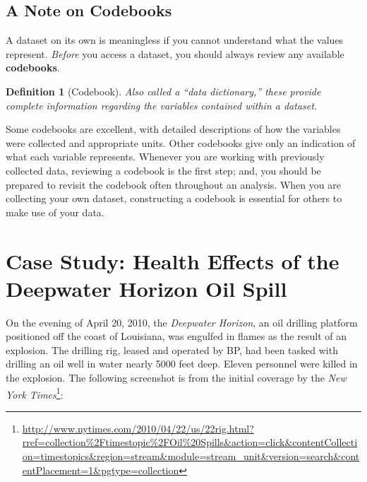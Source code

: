 \documentclass[
]{book}
\theoremstyle{plain}
\theoremstyle{mydefn}
\newtheorem{definition}{Definition}[chapter]
\theoremstyle{myexmpl}
\theoremstyle{remark}
\begin{document}
\hypertarget{a-note-on-codebooks}{%
\section{A Note on Codebooks}\label{a-note-on-codebooks}}

A dataset on its own is meaningless if you cannot understand what the values represent. \emph{Before} you access a dataset, you should always review any available \textbf{codebooks}.

\begin{definition}[Codebook]
\protect\hypertarget{def:defn-codebook}{}{\label{def:defn-codebook} {} }Also called a ``data dictionary,'' these provide complete information regarding the variables contained within a dataset.
\end{definition}

Some codebooks are excellent, with detailed descriptions of how the variables were collected and appropriate units. Other codebooks give only an indication of what each variable represents. Whenever you are working with previously collected data, reviewing a codebook is the first step; and, you should be prepared to revisit the codebook often throughout an analysis. When you are collecting your own dataset, constructing a codebook is essential for others to make use of your data.

\hypertarget{CaseDeepwater}{%
\chapter{Case Study: Health Effects of the Deepwater Horizon Oil Spill}\label{CaseDeepwater}}

On the evening of April 20, 2010, the \emph{Deepwater Horizon}, an oil drilling platform positioned off the coast of Louisiana, was engulfed in flames as the result of an explosion. The drilling rig, leased and operated by BP, had been tasked with drilling an oil well in water nearly 5000 feet deep. Eleven personnel were killed in the explosion. The following screenshot is from the initial coverage by the \emph{New York Times}\footnote{\url{http://www.nytimes.com/2010/04/22/us/22rig.html?rref=collection\%2Ftimestopic\%2FOil\%20Spills\&action=click\&contentCollection=timestopics\&region=stream\&module=stream_unit\&version=search\&contentPlacement=1\&pgtype=collection}}:
\end{document}
